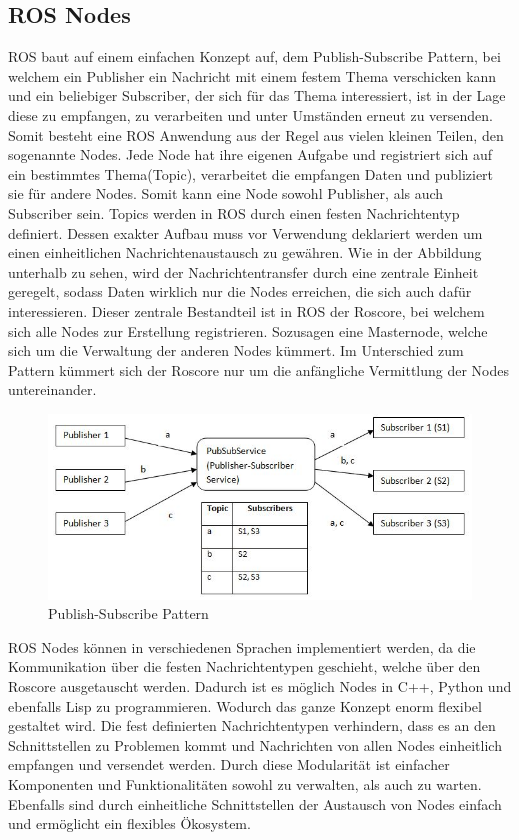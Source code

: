 \subsection{ROS Nodes}
ROS baut auf einem einfachen Konzept auf, dem Publish-Subscribe Pattern, bei welchem ein Publisher ein Nachricht mit einem festem Thema verschicken kann und ein beliebiger Subscriber, der sich für das Thema interessiert, ist in der Lage diese zu empfangen, zu verarbeiten und unter Umständen erneut zu versenden.  Somit besteht eine ROS Anwendung aus der Regel aus vielen kleinen Teilen, den sogenannte Nodes. Jede Node hat ihre eigenen Aufgabe und registriert sich auf ein bestimmtes Thema(Topic), verarbeitet die empfangen Daten und publiziert sie für andere Nodes. Somit kann eine Node sowohl Publisher, als auch Subscriber sein. Topics werden in ROS durch einen festen Nachrichtentyp definiert. Dessen exakter Aufbau muss vor Verwendung deklariert werden um einen einheitlichen Nachrichtenaustausch zu gewähren. Wie in der Abbildung unterhalb zu sehen, wird der Nachrichtentransfer durch eine zentrale Einheit geregelt, sodass Daten wirklich nur die Nodes erreichen, die sich auch dafür interessieren. Dieser zentrale Bestandteil ist in ROS der Roscore, bei welchem sich alle Nodes zur Erstellung registrieren. Sozusagen eine Masternode, welche sich um die Verwaltung der anderen Nodes kümmert. Im Unterschied zum Pattern kümmert sich der Roscore nur um die anfängliche Vermittlung der Nodes untereinander. %
\begin{figure}[ht]
		\centering
	\includegraphics[scale=0.7]{Bilder/pubsub1.jpg}
	\caption[Publish-Subscribe Pattern]{Publish-Subscribe Pattern}

\end{figure}
\newline
ROS Nodes können in verschiedenen Sprachen implementiert werden, da die Kommunikation über die festen Nachrichtentypen geschieht, welche über den Roscore ausgetauscht werden. Dadurch ist es möglich Nodes in C++, Python und ebenfalls Lisp zu programmieren. Wodurch das ganze Konzept enorm flexibel gestaltet wird. Die fest definierten Nachrichtentypen verhindern, dass es an den Schnittstellen zu Problemen kommt und Nachrichten von allen Nodes einheitlich empfangen und versendet werden. \newline
Durch diese Modularität ist einfacher Komponenten und Funktionalitäten sowohl zu verwalten, als auch zu warten. Ebenfalls sind durch einheitliche Schnittstellen der Austausch von Nodes einfach und ermöglicht ein flexibles Ökosystem.

